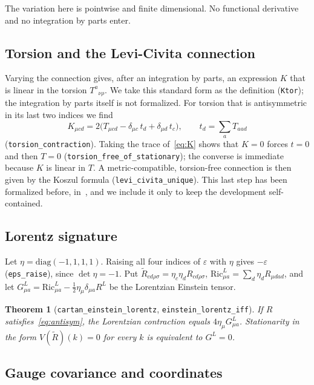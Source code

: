 \documentclass[pdflatex,sn-mathphys-num]{sn-jnl}%
\theoremstyle{thmstyleone}%
\newtheorem{theorem}{Theorem}%
\theoremstyle{thmstyletwo}%
\theoremstyle{thmstylethree}%
\newcommand{\lean}[1]{\texttt{#1}}
\begin{document}
The variation here is pointwise and finite dimensional. No functional derivative and no integration by parts enter.

\subsection{Torsion and the Levi-Civita connection}\label{subsec:torsion}

Varying the connection gives, after an integration by parts, an expression $K$ that is linear in the torsion $T^a{}_{\nu\rho}$. We take this standard form as the definition (\lean{Ktor}); the integration by parts itself is not formalized. For torsion that is antisymmetric in its last two indices we find
\begin{equation}\label{eq:K}
K_{\mu cd}=2\bigl(T_{\mu cd}-\delta_{\mu c}\,t_d+\delta_{\mu d}\,t_c\bigr),\qquad t_d=\sum_aT_{aad}
\end{equation}
(\lean{torsion\_contraction}). Taking the trace of~\eqref{eq:K} shows that $K=0$ forces $t=0$ and then $T=0$ (\lean{torsion\_free\_of\_stationary}); the converse is immediate because $K$ is linear in $T$. A metric-compatible, torsion-free connection is then given by the Koszul formula (\lean{levi\_civita\_unique}). This last step has been formalized before, in~\cite{ChowLiaoQin2026}, and we include it only to keep the development self-contained.

\subsection{Lorentz signature}\label{subsec:lorentz}

Let $\eta=\mathrm{diag}(-1,1,1,1)$. Raising all four indices of $\varepsilon$ with $\eta$ gives $-\varepsilon$ (\lean{eps\_raise}), since $\det\eta=-1$. Put $\tilde R_{cd\rho\sigma}=\eta_c\eta_dR_{cd\rho\sigma}$, $\mathrm{Ric}^L_{\mu a}=\sum_d\eta_dR_{\mu dad}$, and let $G^L_{\mu a}=\mathrm{Ric}^L_{\mu a}-\tfrac12\eta_\mu\delta_{\mu a}R^L$ be the Lorentzian Einstein tensor.

\begin{theorem}[\lean{cartan\_einstein\_lorentz}, \lean{einstein\_lorentz\_iff}]\label{thm:lorentz}
If $R$ satisfies~\eqref{eq:antisym}, the Lorentzian contraction equals $4\eta_\mu G^L_{\mu a}$. Stationarity in the form $V(\tilde R)(k)=0$ for every $k$ is equivalent to $G^L=0$.
\end{theorem}

\subsection{Gauge covariance and coordinates}\label{subsec:coords}
\end{document}
